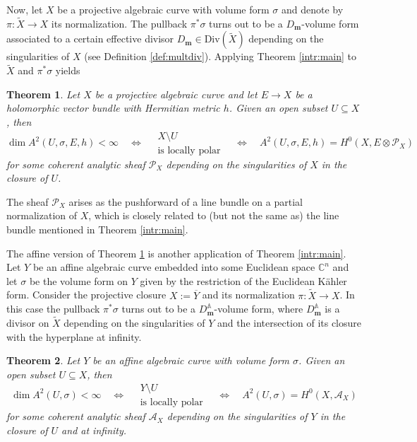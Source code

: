 \documentclass[11pt]{amsart}
\newtheorem{theorem}{Theorem}[section]
\theoremstyle{definition}
\newcommand{\bC}{{\mathbb C}}
\begin{document}
Now, let $X$ be a projective algebraic curve with volume form $\sigma$ and denote by $\pi : \widetilde{X} \to X$ its normalization. The pullback $\pi^*\sigma$ turns out to be a $D_\mathbf{m}$-volume form associated to a certain effective divisor $D_\mathbf{m} \in \text{Div}(\widetilde{X})$ depending on the singularities of $X$ (see Definition \ref{def:multdiv}). Applying Theorem \ref{intr:main} to $\widetilde{X}$ and $\pi^*\sigma$ yields

\begin{theorem}\label{intr:projmain}
    \textit{Let $X$ be a projective algebraic curve and let $E \to X$ be a holomorphic vector bundle with Hermitian metric $h$. Given an open subset $U \subseteq X$, then}
        $$\dim A^2(U,\sigma,E,h) < \infty \quad \Leftrightarrow \quad \begin{array}{c}
        X \setminus U\\
        \text{is locally polar}
        \end{array} \quad \Leftrightarrow \quad A^2(U,\sigma,E,h) = H^0(X,E\otimes \mathcal{P}_X)$$
        \textit{for some coherent analytic sheaf $\mathcal{P}_X$ depending on the singularities of $X$ in the closure of $U$.}
\end{theorem}

\noindent The sheaf $\mathcal{P}_X$ arises as the pushforward of a line bundle on a partial normalization of $X$, which is closely related to (but not the same as) the line bundle mentioned in Theorem \ref{intr:main}.\vspace{3mm}

\noindent The affine version of Theorem \ref{intr:projmain} is another application of Theorem \ref{intr:main}. Let $Y$ be an affine algebraic curve embedded into some Euclidean space $\bC^n$ and let $\sigma$ be the volume form on $Y$ given by the restriction of the Euclidean K\"ahler form. Consider the projective closure $X:=\overline{Y}$ and its normalization $\pi : \widetilde{X} \to X$. In this case the pullback $\pi^*\sigma$ turns out to be a $D_\mathbf{m}^\mathbb{A}$-volume form, where $D_\mathbf{m}^\mathbb{A}$ is a divisor on $\widetilde{X}$ depending on the singularities of $Y$ and the intersection of its closure with the hyperplane at infinity.

\begin{theorem}\label{intr:affmain}
    \textit{Let $Y$ be an affine algebraic curve with volume form $\sigma$. Given an open subset $U \subseteq X$, then}
        $$\dim A^2(U,\sigma) < \infty \quad \Leftrightarrow \quad \begin{array}{c}
        Y \setminus U\\
        \text{is locally polar}
        \end{array} \quad \Leftrightarrow \quad A^2(U,\sigma) = H^0(X,\mathcal{A}_X)$$
        \textit{for some coherent analytic sheaf $\mathcal{A}_X$ depending on the singularities of $Y$ in the closure of $U$ and at infinity.}
\end{theorem}
\end{document}
